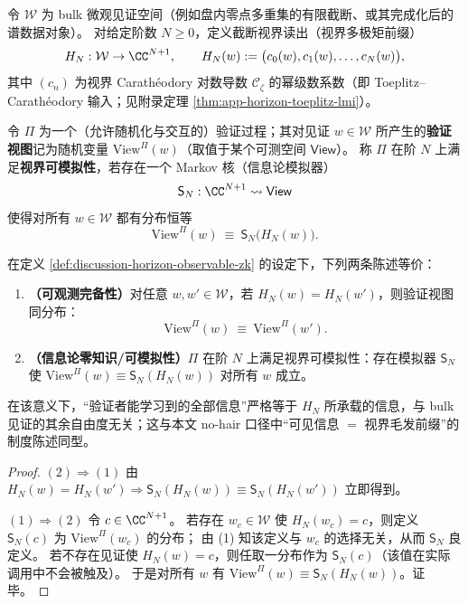 \begin{definition}[截断视界可观测量与可模拟性语义]\label{def:discussion-horizon-observable-zk}
令 \(\mathcal{W}\) 为 bulk 微观见证空间（例如盘内零点多重集的有限截断、或其完成化后的谱数据对象）。
对给定阶数 \(N\ge 0\)，定义截断视界读出（视界多极矩前缀）
\[
H_N:\mathcal{W}\to \CC^{N+1},\qquad
H_N(w):=\bigl(c_0(w),c_1(w),\dots,c_N(w)\bigr),
\]
其中 \((c_n)\) 为视界 Carath\'eodory 对数导数 \(\mathscr{C}_\zeta\) 的幂级数系数（即 Toeplitz--Carath\'eodory 输入；见附录定理 \ref{thm:app-horizon-toeplitz-lmi}）。
\par
令 \(\Pi\) 为一个（允许随机化与交互的）验证过程；其对见证 \(w\in\mathcal{W}\) 所产生的\textbf{验证视图}记为随机变量 \(\mathrm{View}^{\Pi}(w)\)（取值于某个可测空间 \(\mathsf{View}\)）。
称 \(\Pi\) 在阶 \(N\) 上满足\textbf{视界可模拟性}，若存在一个 Markov 核（信息论模拟器）
\[
\mathsf{S}_N:\CC^{N+1}\rightsquigarrow \mathsf{View}
\]
使得对所有 \(w\in\mathcal{W}\) 都有分布恒等
\[
\mathrm{View}^{\Pi}(w)\ \equiv\ \mathsf{S}_N\bigl(H_N(w)\bigr).
\]
\end{definition}

\begin{proposition}\label{prop:discussion-nohair-iff-zk}
在定义 \ref{def:discussion-horizon-observable-zk} 的设定下，下列两条陈述等价：
\begin{enumerate}
  \item \textbf{（可观测完备性）}对任意 \(w,w'\in\mathcal{W}\)，若 \(H_N(w)=H_N(w')\)，则验证视图同分布：
  \[
  \mathrm{View}^{\Pi}(w)\ \equiv\ \mathrm{View}^{\Pi}(w').
  \]
  \item \textbf{（信息论零知识/可模拟性）}\(\Pi\) 在阶 \(N\) 上满足视界可模拟性：存在模拟器 \(\mathsf{S}_N\) 使 \(\mathrm{View}^{\Pi}(w)\equiv \mathsf{S}_N(H_N(w))\) 对所有 \(w\) 成立。
\end{enumerate}
在该意义下，“验证者能学习到的全部信息”严格等于 \(H_N\) 所承载的信息，与 bulk 见证的其余自由度无关；这与本文 no-hair 口径中“可见信息 \(=\) 视界毛发前缀”的制度陈述同型。
\end{proposition}

\begin{proof}
\((2)\Rightarrow(1)\) 由 \(H_N(w)=H_N(w')\Rightarrow \mathsf{S}_N(H_N(w))\equiv \mathsf{S}_N(H_N(w'))\) 立即得到。
\par
\((1)\Rightarrow(2)\) 令 \(c\in\CC^{N+1}\)。
若存在 \(w_c\in\mathcal{W}\) 使 \(H_N(w_c)=c\)，则定义 \(\mathsf{S}_N(c)\) 为 \(\mathrm{View}^\Pi(w_c)\) 的分布；
由 (1) 知该定义与 \(w_c\) 的选择无关，从而 \(\mathsf{S}_N\) 良定义。
若不存在见证使 \(H_N(w)=c\)，则任取一分布作为 \(\mathsf{S}_N(c)\)（该值在实际调用中不会被触及）。
于是对所有 \(w\) 有 \(\mathrm{View}^\Pi(w)\equiv \mathsf{S}_N(H_N(w))\)。证毕。
\end{proof}

